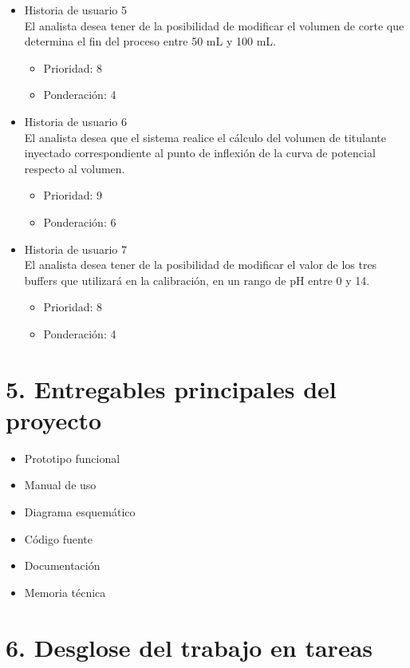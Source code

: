\documentclass[11pt]{charter}
\begin{document}
\begin{itemize}
\item Historia de usuario 5\\El analista desea tener de la posibilidad de modificar el volumen de corte que determina el fin del proceso entre 50 mL y 100 mL.
	\begin{itemize}
	\item Prioridad: 8
	\item Ponderación: 4
	\end{itemize}
	
\item Historia de usuario 6\\El analista desea que el sistema realice el cálculo del volumen de titulante inyectado correspondiente al punto de inflexión de la curva de potencial respecto al volumen.
	\begin{itemize}
	\item Prioridad: 9
	\item Ponderación: 6
	\end{itemize}
	
\item Historia de usuario 7\\El analista desea tener de la posibilidad de modificar el valor de los tres buffers que utilizará en la calibración, en un rango de pH entre 0 y 14.
	\begin{itemize}
	\item Prioridad: 8
	\item Ponderación: 4
	\end{itemize}
	
\end{itemize}


\section{5. Entregables principales del proyecto}
\label{sec:entregables}

\begin{itemize}
\item Prototipo funcional
\item Manual de uso
\item Diagrama esquemático
\item Código fuente
\item Documentación
\item Memoria técnica
\end{itemize}

\section{6. Desglose del trabajo en tareas}
\label{sec:wbs}
\end{document}
